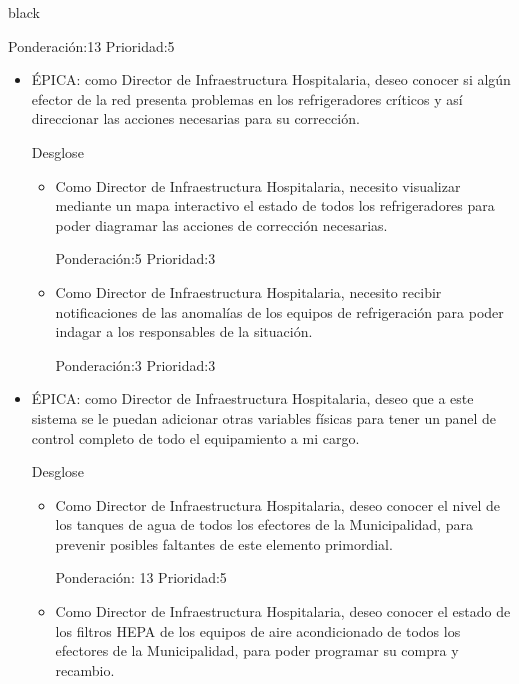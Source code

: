 \documentclass[11pt]{charter}
\begin{document}
\begin{consigna}{black}
\begin{itemize}
\begin{itemize}
Ponderación:13 Prioridad:5
	\end{itemize}
\end{itemize}

\begin{itemize}
\item ÉPICA: como Director de Infraestructura Hospitalaria, deseo conocer si algún efector de la red presenta problemas en los refrigeradores críticos y así direccionar las acciones necesarias para su corrección. 

Desglose

	\begin{itemize}
	\item Como Director de Infraestructura Hospitalaria, necesito visualizar mediante un mapa interactivo el estado de todos los refrigeradores para poder diagramar las acciones de corrección necesarias.  

Ponderación:5 Prioridad:3
	\end{itemize}

	\begin{itemize}
	\item Como Director de Infraestructura Hospitalaria, necesito recibir notificaciones de las anomalías de los equipos de refrigeración para poder indagar a los responsables de la situación.  

Ponderación:3 Prioridad:3
	\end{itemize}

\end{itemize}


\begin{itemize}
\item ÉPICA: como Director de Infraestructura Hospitalaria, deseo que a este sistema se le puedan adicionar otras variables físicas para tener un panel de control completo de todo el equipamiento a mi cargo. 

Desglose

	\begin{itemize}
	\item Como Director de Infraestructura Hospitalaria, deseo conocer el nivel de los tanques de agua de todos los efectores de la Municipalidad, para prevenir posibles faltantes de este elemento primordial.
	
Ponderación: 13 Prioridad:5
	\end{itemize}

	\begin{itemize}
	\item Como Director de Infraestructura Hospitalaria, deseo conocer el estado de los filtros HEPA de los equipos de aire acondicionado de todos los efectores de la Municipalidad, para poder programar su compra y recambio.
	

\end{itemize}
\end{itemize}
\end{consigna}
\end{document}
